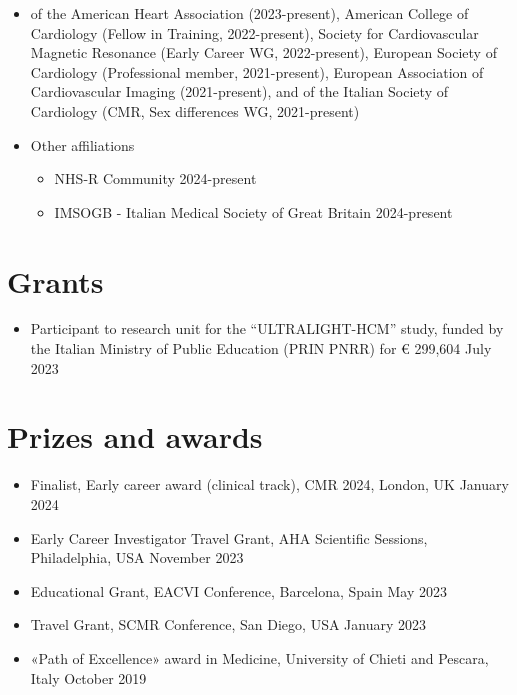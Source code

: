 \documentclass[
  11pt,
]
{article}
\providecommand{\tightlist}{%
  \setlength{\itemsep}{0pt}\setlength{\parskip}{0pt}}
\begin{document}
\begin{itemize}
\item
  \tinyMember of the American Heart Association (2023-present), American
  College of Cardiology (Fellow in Training, 2022-present), Society for
  Cardiovascular Magnetic Resonance (Early Career WG, 2022-present),
  European Society of Cardiology (Professional member, 2021-present),
  European Association of Cardiovascular Imaging (2021-present), and of
  the Italian Society of Cardiology (CMR, Sex differences WG,
  2021-present)
\item
  Other affiliations

  \begin{itemize}
  \tightlist
  \item
    NHS-R Community \hfill 2024-present
  \item
    IMSOGB - Italian Medical Society of Great Britain
    \hfill 2024-present
  \end{itemize}
\end{itemize}

\section{Grants}\label{grants}

\begin{itemize}
\tightlist
\item
  Participant to research unit for the ``ULTRALIGHT-HCM'' study, funded
  by the Italian Ministry of Public Education (PRIN PNRR) for € 299,604
  \hfill July 2023
\end{itemize}

\section{Prizes and awards}\label{prizes-and-awards}

\begin{itemize}
\tightlist
\item
  Finalist, Early career award (clinical track), CMR 2024, London, UK
  \hfill January 2024
\item
  Early Career Investigator Travel Grant, AHA Scientific Sessions,
  Philadelphia, USA \hfill November 2023
\item
  Educational Grant, EACVI Conference, Barcelona, Spain \hfill May 2023
\item
  Travel Grant, SCMR Conference, San Diego, USA \hfill January 2023
\item
  «Path of Excellence» award in Medicine, University of Chieti and
  Pescara, Italy \hfill October 2019
\end{itemize}
\end{document}
